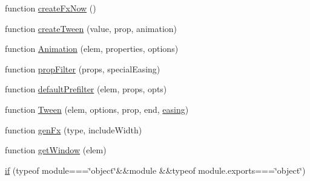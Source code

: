 \begin{DoxyCompactItemize}
\item 
function \hyperlink{obj_2_release_2_package_2_package_tmp_2_scripts_2jquery-1_810_82_8js_a3c7bcef859b0811abb1dbf890c6cc635}{create\+Fx\+Now} ()
\item 
function \hyperlink{obj_2_release_2_package_2_package_tmp_2_scripts_2jquery-1_810_82_8js_a0c2043fcd2fa684768877127fbbc2e55}{create\+Tween} (value, prop, animation)
\item 
function \hyperlink{obj_2_release_2_package_2_package_tmp_2_scripts_2jquery-1_810_82_8js_aa33f7dcb8ee41587d545a0bc69849296}{Animation} (elem, properties, options)
\item 
function \hyperlink{obj_2_release_2_package_2_package_tmp_2_scripts_2jquery-1_810_82_8js_a0196d1f08ae60b747901b5a2950f72f1}{prop\+Filter} (props, special\+Easing)
\item 
function \hyperlink{obj_2_release_2_package_2_package_tmp_2_scripts_2jquery-1_810_82_8js_a8041b1040535dcee84ad474aaaf11dde}{default\+Prefilter} (elem, props, opts)
\item 
function \hyperlink{obj_2_release_2_package_2_package_tmp_2_scripts_2jquery-1_810_82_8js_adcb517ce3709049d37bb5f5bd3811edf}{Tween} (elem, options, prop, end, \hyperlink{_scripts_2jquery-1_810_82_8js_a9758a312629fa6de1744280dd6e6253b}{easing})
\item 
function \hyperlink{obj_2_release_2_package_2_package_tmp_2_scripts_2jquery-1_810_82_8js_a0dad9ae6c57fd32a071de202faa87081}{gen\+Fx} (type, include\+Width)
\item 
function \hyperlink{obj_2_release_2_package_2_package_tmp_2_scripts_2jquery-1_810_82_8js_ab8e6e1fb3b8b51b6afe437c63df0e09f}{get\+Window} (elem)
\item 
\hyperlink{obj_2_release_2_package_2_package_tmp_2_scripts_2jquery-1_810_82_8js_aa2cebb51f03a2e3ab2af45a3f9241c96}{if} (typeof module===\char`\"{}object\char`\"{}\&\&module \&\&typeof module.\+exports===\char`\"{}object\char`\"{})
\end{DoxyCompactItemize}
